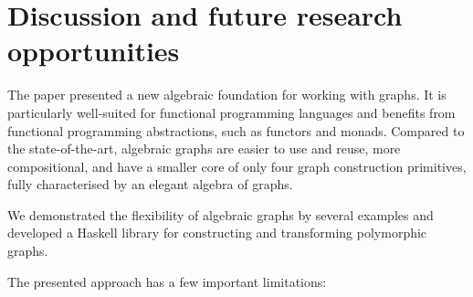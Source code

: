 \vspace{-1mm}
\section{Discussion and future research opportunities}\label{sec-discussion}

The paper presented a new algebraic foundation for working with graphs.
It is particularly well-suited for functional programming languages
and benefits from functional programming abstractions, such as functors and
monads. Compared to the state-of-the-art, algebraic graphs are easier to use and reuse,
more compositional, and have a smaller core of only four graph
construction primitives, fully characterised by an elegant algebra of graphs.

We demonstrated the flexibility of algebraic graphs by several examples and
developed a Haskell library for constructing and transforming polymorphic graphs.

The presented approach has a few important limitations:

